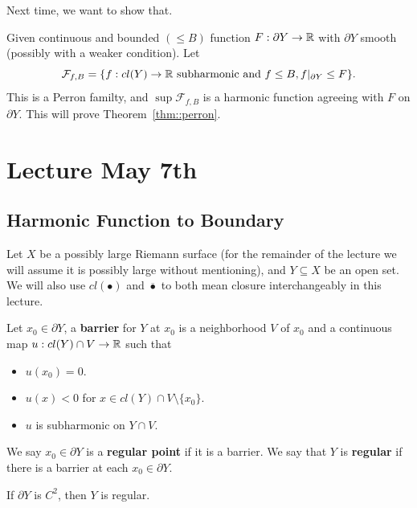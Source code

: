 \documentclass{article}
\begin{document}
{Next time, we want to show that.
\begin{theorem}
    Given continuous and bounded $(\leq B)$ function $F: \partial Y \to \mathbb{R}$ with $\partial Y$ smooth (possibly with a weaker condition). Let
    \[\mathcal{F}_{f, B} = \{f: cl(Y) \to \mathbb{R} \text{ subharmonic and } f \leq B, f|_{\partial Y} \leq F\}.\]
    This is a Perron familty, and $\sup \mathcal{F}_{f, B}$ is a harmonic function agreeing with $F$ on $\partial Y$. This will prove Theorem~\ref{thm::perron}.
\end{theorem}

\newpage
\section{Lecture May 7th}

\subsection{Harmonic Function to Boundary}

Let $X$ be a possibly large Riemann surface (for the remainder of the lecture we will assume it is possibly large without mentioning), and $Y \subseteq X$ be an open set. We will also use $cl(\bullet)$ and $\overline{\bullet}$ to both mean closure interchangeably in this lecture.\\

\begin{definition}
Let $x_0 \in \partial Y$, a \textbf{barrier} for $Y$ at $x_0$ is a neighborhood $V$ of $x_0$ and a continuous map $u: cl(Y) \cap V \to \mathbb{R}$ such that 
\begin{itemize}
    \item $u(x_0) = 0$.
    \item $u(x) < 0$ for $x \in cl(Y) \cap V \setminus \{x_0\}$.
    \item $u$ is subharmonic on $Y \cap V$.
\end{itemize}  
We say $x_0 \in \partial Y$ is a \textbf{regular point} if it is a barrier. We say that $Y$ is \textbf{regular} if there is a barrier at each $x_0 \in \partial Y$.
\end{definition}

\begin{theorem}
    If $\partial Y$ is $C^2$, then $Y$ is regular.
\end{theorem}

}
\end{document}

